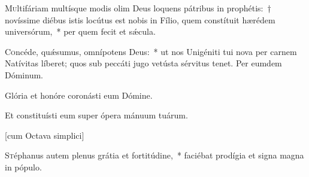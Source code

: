 \documentclass[vesperale_romanum.tex]{subfiles}
\begin{document}
\label{cap_2_vesperis_nativitatis_dom} 
{}

\lettrine{M}{u}ltifáriam multísque modis olim Deus loquens pátribus in prophétis:~† novíssime diébus istis locútus est nobis in Fílio, quem constítuit hærédem universórum,~* per quem fecit et sǽcula.


\label{versiculus_ii_vesperis_nativitatis_domini} 
{}


\admagnificat \label{hodie_christus_natus_est} 
{}

\oratio \label{or_natitivatis_dom} 


\lettrine{C}{o}ncéde, quǽsumus, omnípotens Deus:~* ut nos Unigéniti tui nova per carnem Natívitas líberet; quos sub peccáti jugo vetústa sérvitus tenet.
Per eumdem Dóminum.




\vv Glória et honóre coronásti eum Dómine.

\rr Et constituísti eum super ópera mánuum tuárum.


 \label{dec_26} 


[cum Octava simplici]



\lettrine{S}{t}éphanus autem plenus grátia et fortitúdine,~* faciébat prodígia et signa magna in pópulo.
\end{document}
